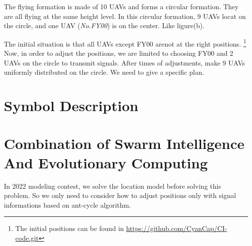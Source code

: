 \documentclass[lang=cn,a4paper,newtx]{elegantpaper}
\begin{document}
The flying formation is made of 10 UAVs and forms a circular formation.
They are all flying at the same height level. 
In this circular formation, 9 UAVs locat on the circle, and one UAV (\textit{No.FY00}) is on the center. Like ligure(b).
\par
The initial situation is that all UAVs except FY00 arenot at the right positions.
\footnote{The initial positions can be found in \url{https://github.com/CyanCap/CI-code.git}}
Now, in order to adjust the positions, we are limited to choosing FY00 and 2 UAVs on the circle to transmit signals.
After times of adjustments, make 9 UAVs uniformly distributed on the circle. 
We need to give a specific plan.

\section{Symbol Description}
\begin{center}
\end{center}

\section{Combination of Swarm Intelligence And Evolutionary Computing}
In 2022 modeling contest, we solve the location model before solving this problem.
So we only need to consider how to adjust positions only with signal informations based on ant-cycle algorithm.
\end{document}
